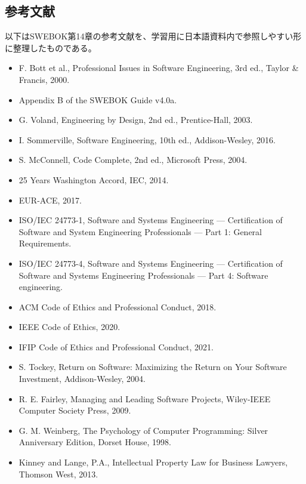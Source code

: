\subsection*{参考文献}


以下はSWEBOK第14章の参考文献を、学習用に日本語資料内で参照しやすい形に整理したものである。

\begin{itemize}[leftmargin=2em]

\item F. Bott et al., Professional Issues in Software Engineering, 3rd ed., Taylor \& Francis, 2000.

\item Appendix B of the SWEBOK Guide v4.0a.

\item G. Voland, Engineering by Design, 2nd ed., Prentice-Hall, 2003.

\item I. Sommerville, Software Engineering, 10th ed., Addison-Wesley, 2016.

\item S. McConnell, Code Complete, 2nd ed., Microsoft Press, 2004.

\item 25 Years Washington Accord, IEC, 2014.

\item EUR-ACE, 2017.

\item ISO/IEC 24773-1, Software and Systems Engineering — Certification of Software and System Engineering Professionals — Part 1: General Requirements.

\item ISO/IEC 24773-4, Software and Systems Engineering — Certification of Software and Systems Engineering Professionals — Part 4: Software engineering.

\item ACM Code of Ethics and Professional Conduct, 2018.

\item IEEE Code of Ethics, 2020.

\item IFIP Code of Ethics and Professional Conduct, 2021.

\item S. Tockey, Return on Software: Maximizing the Return on Your Software Investment, Addison-Wesley, 2004.

\item R. E. Fairley, Managing and Leading Software Projects, Wiley-IEEE Computer Society Press, 2009.

\item G. M. Weinberg, The Psychology of Computer Programming: Silver Anniversary Edition, Dorset House, 1998.

\item Kinney and Lange, P.A., Intellectual Property Law for Business Lawyers, Thomson West, 2013.

\end{itemize}
